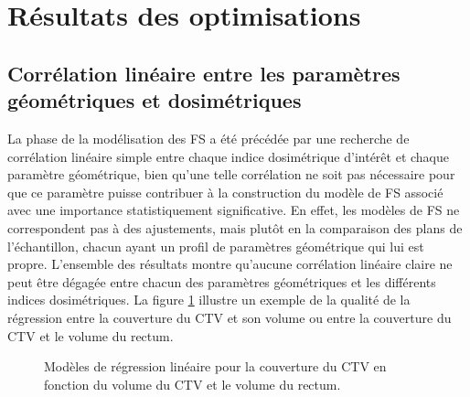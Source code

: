 \section{Résultats des optimisations}
\subsection{Corrélation linéaire entre les paramètres géométriques et dosimétriques}
La phase de la modélisation des FS a été précédée par une recherche de corrélation linéaire simple entre chaque indice dosimétrique d'intérêt et chaque paramètre géométrique, bien qu'une telle corrélation ne soit pas nécessaire pour que ce paramètre puisse contribuer à la construction du modèle de FS associé avec une importance statistiquement significative. En effet, les modèles de FS ne correspondent pas à des ajustements, mais plutôt en la comparaison des plans de l'échantillon, chacun ayant un profil de paramètres géométrique qui lui est propre. L'ensemble des résultats montre qu'aucune corrélation linéaire claire ne peut être dégagée entre chacun des paramètres géométriques et les différents indices dosimétriques. La figure \ref{ModeleRegresPG} illustre un exemple de la qualité de la régression entre la couverture du CTV et son volume ou entre la couverture du CTV et le volume du rectum. 
%
\begin{figure}[htt!]
  \centering
  \hspace{0.5cm}
  \hspace{0.5cm}
\caption{\label{ModeleRegresPG} Modèles de régression linéaire pour la couverture du CTV en fonction du volume du CTV et le volume du rectum.}
\end{figure}
